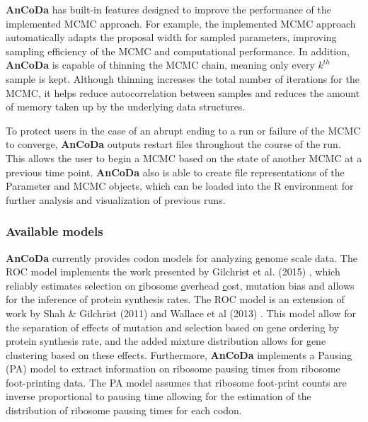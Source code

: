 \documentclass{bioinfo}
\newcommand{\package}{\textbf{AnCoDa }} %
\begin{document}
\package has built-in features designed to improve the performance of the implemented MCMC approach. For example, the implemented MCMC approach automatically adapts the proposal width for sampled parameters, improving sampling efficiency of the MCMC and computational performance. In addition, \package is capable of thinning the MCMC chain, meaning only every $k^{th}$ sample is kept. Although thinning increases the total number of iterations for the MCMC, it helps reduce autocorrelation between samples and reduces the amount of memory taken up by the underlying data structures. 

To protect users in the case of an abrupt ending to a run or failure of the MCMC to converge, \package outputs restart files throughout the course of the run. This allows the user to begin a MCMC based on the state of another MCMC at a previous time point. \package also is able to create file representations of the Parameter and MCMC objects, which can be loaded into the R environment for further analysis and visualization of previous runs.
 
\subsubsection*{Available models}
\package currently provides codon models for analyzing genome scale data.
The ROC model implements the work presented by Gilchrist et al. (2015) \citep{gilchrist2015}, which reliably estimates selection on \underline{r}ibosome \underline{o}verhead \underline{c}ost, mutation bias and allows for the inference of protein synthesis rates. The ROC model is an extension of work by Shah \& Gilchrist (2011) \citep{shah2011} and  Wallace et al (2013) \citep{wallace2013}. 
This model allow for the separation of effects of mutation and selection based on gene ordering by protein synthesis rate, and the added mixture distribution allows for gene clustering based on these effects.
Furthermore, \package implements a Pausing (PA) model to extract information on ribosome pausing times from ribosome foot-printing data. The PA model assumes that ribosome foot-print counts are inverse proportional to pausing time allowing for the estimation of the distribution of ribosome pausing times for each codon. 
\end{document}
